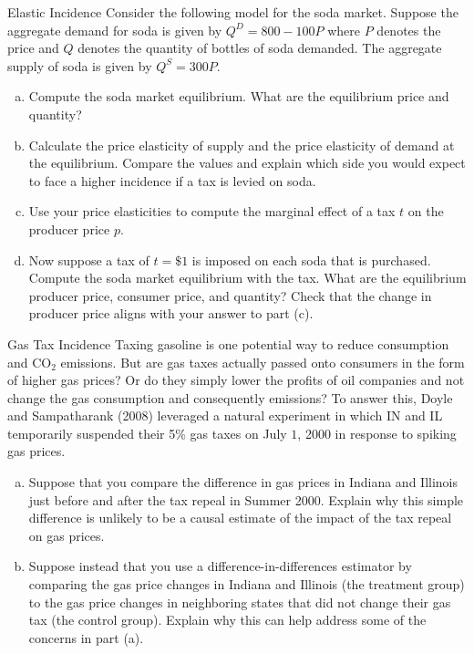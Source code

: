 \documentclass[8pt]{extarticle}
\title{}
\author{}
\date{}
\begin{document}
  \begin{problem}{Elastic Incidence}
    Consider the following model for the soda market. Suppose the aggregate demand for soda is given by $Q^D = 800 - 100P$ where $P$ denotes the price and $Q$ denotes the quantity of bottles of soda demanded. The aggregate supply of soda is given by $Q^S = 300P$.
    \begin{enumerate}[(a)]
      \item Compute the soda market equilibrium. What are the equilibrium price and quantity?
      \item Calculate the price elasticity of supply and the price elasticity of demand at the equilibrium. Compare the values and explain which side you would expect to face a higher incidence if a tax is levied on soda.
      \item Use your price elasticities to compute the marginal effect of a tax $t$ on the producer price $p$.
      \item Now suppose a tax of $t = \$1$ is imposed on each soda that is purchased. Compute the soda market equilibrium with the tax. What are the equilibrium producer price, consumer price, and quantity? Check that the change in producer price aligns with your answer to part (c).
    \end{enumerate}
  \end{problem}
  \begin{problem}{Gas Tax Incidence}
    Taxing gasoline is one potential way to reduce consumption and CO$_2$ emissions. But are gas taxes actually passed onto consumers in the form of higher gas prices? Or do they simply lower the profits of oil companies and not change the gas consumption and consequently emissions? To answer this, Doyle and Sampatharank (2008) leveraged a natural experiment in which IN and IL temporarily suspended their 5\% gas taxes on July $1$, 2000 in response to spiking gas prices.
    \begin{enumerate}[(a)]
      \item Suppose that you compare the difference in gas prices in Indiana and Illinois just before and after the tax repeal in Summer 2000. Explain why this simple difference is unlikely to be a causal estimate of the impact of the tax repeal on gas prices.
      \item Suppose instead that you use a difference-in-differences estimator by comparing the gas price changes in Indiana and Illinois (the treatment group) to the gas price changes in neighboring states that did not change their gas tax (the control group). Explain why this can help address some of the concerns in part (a).
    \end{enumerate}
  \end{problem}
\end{document}
